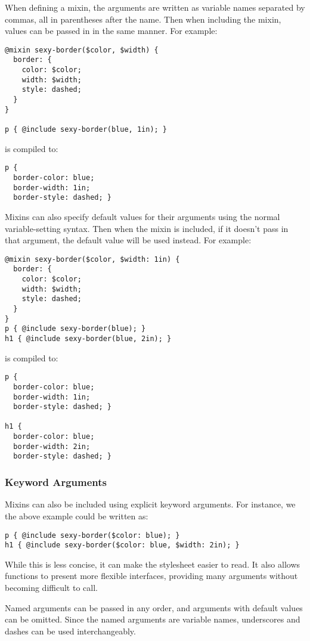 \documentclass[9pt]{article}
\begin{document}
 When defining a mixin, the arguments are written as variable names separated by commas, all in parentheses after the name. Then when including the mixin, values can be passed in in the same manner. For example:
\begin{verbatim}
@mixin sexy-border($color, $width) {
  border: {
    color: $color;
    width: $width;
    style: dashed;
  }
}

p { @include sexy-border(blue, 1in); }
\end{verbatim}


 is compiled to:
\begin{verbatim}
p {
  border-color: blue;
  border-width: 1in;
  border-style: dashed; }
\end{verbatim}


 Mixins can also specify default values for their arguments using the normal variable-setting syntax. Then when the mixin is included, if it doesn’t pass in that argument, the default value will be used instead. For example:
\begin{verbatim}
@mixin sexy-border($color, $width: 1in) {
  border: {
    color: $color;
    width: $width;
    style: dashed;
  }
}
p { @include sexy-border(blue); }
h1 { @include sexy-border(blue, 2in); }
\end{verbatim}


 is compiled to:
\begin{verbatim}
p {
  border-color: blue;
  border-width: 1in;
  border-style: dashed; }

h1 {
  border-color: blue;
  border-width: 2in;
  border-style: dashed; }
\end{verbatim}
\subsubsection{Keyword Arguments}


 Mixins can also be included using explicit keyword arguments. For instance, we the above example could be written as:
\begin{verbatim}
p { @include sexy-border($color: blue); }
h1 { @include sexy-border($color: blue, $width: 2in); }
\end{verbatim}


 While this is less concise, it can make the stylesheet easier to read. It also allows functions to present more flexible interfaces, providing many arguments without becoming difficult to call.


 Named arguments can be passed in any order, and arguments with default values can be omitted. Since the named arguments are variable names, underscores and dashes can be used interchangeably.
\end{document}
